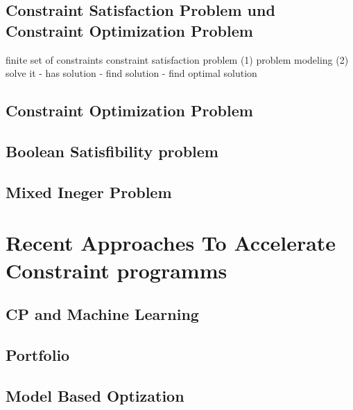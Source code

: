 \subsection{Constraint Satisfaction Problem und Constraint Optimization Problem} 
\label{sec:Constraint Satisfaction Problem und Constraint Optimization Problem}



\label{sec:Grundlagen}
finite set of constraints \cite[1]{aptjo} constraint satisfaction problem
\cite[1]{aptjo} (1) problem modeling (2) solve it - has solution - find solution
- find optimal solution
\cite*[postnote]{aptjo}


\subsection{Constraint Optimization Problem}
\label{sec: Constraint Optimization Problem}


\subsection{Boolean Satisfibility problem}
\label{sec: Boolean Satisfibility problem}


\subsection{Mixed Ineger Problem}
\label{sec: Mixed Ineger Problem}


\section{Recent Approaches To Accelerate Constraint programms}
\label{sec:Recent Approaches To Accelerate Constraint programms}


\subsection{CP and Machine Learning}
\label{sec:CP and Machine Learning}

  
\subsection{Portfolio}
\label{sec:Portfolio}

  
\subsection{Model Based Optization}
\label{sec:Model Based Optization}

